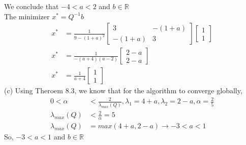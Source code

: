 \documentclass[12pt]{article}
\begin{document}
We conclude that $ -4 < a < 2 $ and $ b \in \mathbb{R} $ \\
The minimizer $x^* = Q^{-1}b$
\begin{align*}
  x^* &= \frac{1}{9-(1+a)^2}\begin{bmatrix}
    3 & -(1+a) \\ -(1+a) & 3
  \end{bmatrix}\begin{bmatrix}
    1 \\ 1
  \end{bmatrix} \\
  x^* &= \frac{1}{-(a+4)(a-2)}\begin{bmatrix}
    2-a \\ 2-a
  \end{bmatrix} \\
  x^* &= \frac{1}{a+4}\begin{bmatrix}
    1 \\ 1
  \end{bmatrix}
\end{align*}
(c) Using Theroem 8.3, we know that for the algorithm to converge globally, 
\begin{align*}
  0 < \alpha &< \frac{2}{\lambda_{max}(Q)}, \lambda_1 = 4+a, \lambda_2=2-a, \alpha = \frac{2}{5} \\
  \lambda_{max}(Q) &< \frac{2}{\alpha} =  5 \\
  \lambda_{max}(Q) &= max(4+a, 2-a) \rightarrow -3 < a < 1 
\end{align*}
So, $-3 < a < 1$ and $b \in \mathbb{R}$
\end{document}
